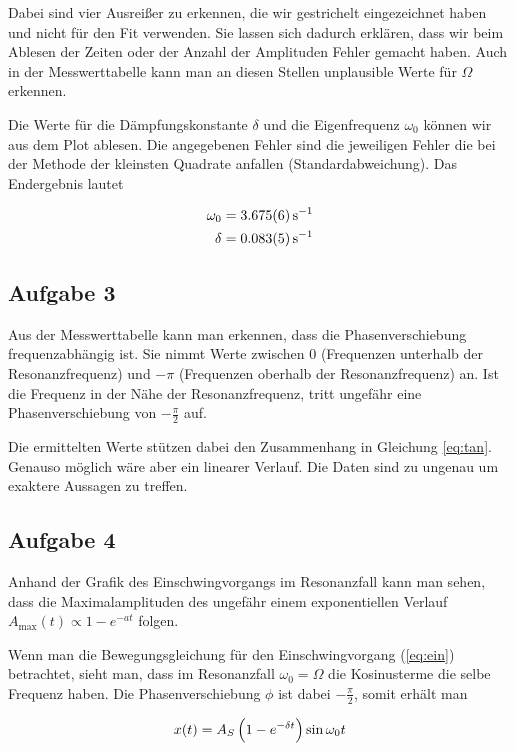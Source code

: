 \documentclass[a4paper,german,12pt,smallheadings]{scrartcl}
\begin{document}
Dabei sind vier Ausreißer zu erkennen, die wir gestrichelt eingezeichnet haben
und nicht für den Fit verwenden. Sie lassen sich dadurch erklären, dass wir
beim Ablesen der Zeiten oder der Anzahl der Amplituden Fehler gemacht haben.
Auch in der Messwerttabelle kann man an diesen Stellen unplausible Werte für
$\Omega$ erkennen.

Die Werte für die Dämpfungskonstante $\delta$ und die Eigenfrequenz $\omega_0$
können wir aus dem Plot ablesen.  Die angegebenen Fehler sind die jeweiligen
Fehler die bei der Methode der kleinsten Quadrate anfallen
(Standardabweichung). Das Endergebnis lautet

\begin{align}
  \omega_0 &= \SI{3,675+-0.006}{s^{-1}} \\
  \delta &= \SI{0.083+-0.005}{s^{-1}}
\end{align}

\subsection{Aufgabe 3}
Aus der Messwerttabelle kann man erkennen, dass die Phasenverschiebung
frequenzabhängig ist. Sie nimmt Werte zwischen $0$ (Frequenzen unterhalb der
Resonanzfrequenz) und $-\pi$ (Frequenzen oberhalb der Resonanzfrequenz) an. Ist
die Frequenz in der Nähe der Resonanzfrequenz, tritt ungefähr eine
Phasenverschiebung von $-\frac{\pi}{2}$ auf.

Die ermittelten Werte stützen dabei den Zusammenhang in Gleichung \ref{eq:tan}.
Genauso möglich wäre aber ein linearer Verlauf. Die Daten sind zu ungenau um
exaktere Aussagen zu treffen.

\subsection{Aufgabe 4}
Anhand der Grafik des Einschwingvorgangs im Resonanzfall kann man sehen, dass
die Maximalamplituden des ungefähr einem exponentiellen Verlauf
$A_\text{max}(t) \propto 1 - e^{- a t}$ folgen.

Wenn man die Bewegungsgleichung für den Einschwingvorgang
(\ref{eq:ein}) betrachtet, sieht man, dass im Resonanzfall $\omega_0 = \Omega$
die Kosinusterme die selbe Frequenz haben. Die Phasenverschiebung $\phi$ ist
dabei $-\frac{\pi}{2}$, somit erhält man

\begin{equation}
  x(t) = A_S \del{1 - e^{-\delta t}} \sin \omega_0 t
\end{equation}
\end{document}
